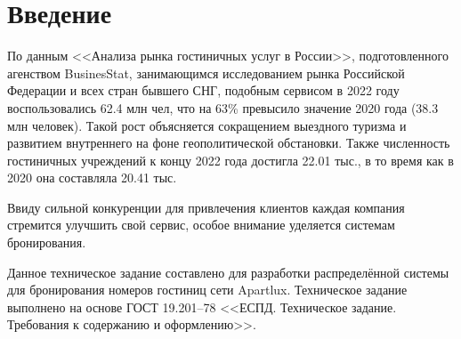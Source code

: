 \section*{Введение}
По данным <<Анализа рынка гостиничных услуг в России>>, подготовленного агенством BusinesStat, занимающимся исследованием рынка Российской Федерации и всех стран бывшего СНГ, подобным сервисом в 2022 году воспользовались 62.4 млн чел, что на 63\% превысило значение 2020 года (38.3 млн человек). Такой рост объясняется сокращением выездного туризма и развитием внутреннего на фоне геополитической обстановки. Также численность гостиничных учреждений к концу 2022 года достигла 22.01 тыс., в то время как в 2020 она составляла 20.41 тыс. 

Ввиду сильной конкуренции для привлечения клиентов каждая компания стремится улучшить свой сервис, особое внимание уделяется системам бронирования.

Данное техническое задание составлено для разработки распределённой системы для  бронирования номеров гостиниц сети Apartlux. Техническое задание выполнено на основе ГОСТ 19.201--78 <<ЕСПД. Техническое задание. Требования к содержанию и оформлению>>.